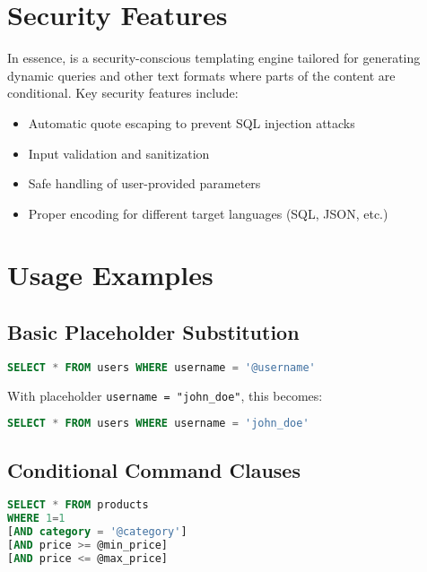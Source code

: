 \section{Security Features}
\label{sec:wbpl-security}

In essence, \wbpl{} is a security-conscious templating engine tailored for generating dynamic queries and other text formats where parts of the content are conditional. Key security features include:

\begin{itemize}
\item Automatic quote escaping to prevent SQL injection attacks
\item Input validation and sanitization
\item Safe handling of user-provided parameters
\item Proper encoding for different target languages (SQL, JSON, etc.)
\end{itemize}

\section{Usage Examples}
\label{sec:wbpl-examples}

\subsection{Basic Placeholder Substitution}

\begin{lstlisting}[language=SQL,caption={Simple WBPL Substitution}]
SELECT * FROM users WHERE username = '@username'
\end{lstlisting}

With placeholder \texttt{username = "john\_doe"}, this becomes:
\begin{lstlisting}[language=SQL]
SELECT * FROM users WHERE username = 'john_doe'
\end{lstlisting}

\subsection{Conditional Command Clauses}

\begin{lstlisting}[language=SQL,caption={WBPL Conditional Blocks}]
SELECT * FROM products 
WHERE 1=1 
[AND category = '@category'] 
[AND price >= @min_price] 
[AND price <= @max_price]
\end{lstlisting}

